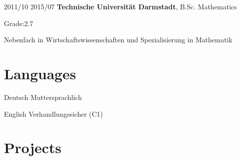 \documentclass{maxcv}
\begin{document}
\vspace{0.2 cm}

\begin{twocolentry}{2011/10 \dash{} 2015/07}
    \textbf{Technische Universität Darmstadt}, B.Sc. Mathematics
\end{twocolentry}
\vspace{0.10 cm}
\begin{onecolentry}
    \begin{highlights}
        \item Grade:\@ 2.7
        \item Nebenfach in Wirtschaftswissenschaften und Spezialisierung in Mathematik
    \end{highlights}
\end{onecolentry}

\section{Languages}

\begin{highlights}
    \item Deutsch \dash{} Muttersprachlich
    \item English \dash{} Verhandlungssicher (C1)
\end{highlights}

\section{Projects}



\end{document}
